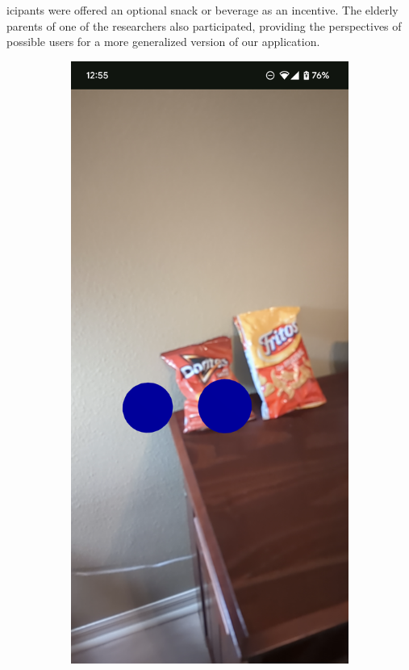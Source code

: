 \documentclass[thesis]{fputhesis}
\begin{document}
\begin{body}
icipants were offered an optional snack or beverage as an incentive. The elderly parents of one of the researchers also participated, providing the perspectives of possible users for a more generalized version of our application.
\begin{figure}[h]
    \centering
    \begin{subfigure}[]{0.3\textwidth}
        \centering
        \includegraphics[width=\linewidth]{Images/markeralignment.png}

\end{subfigure}
\end{figure}
\end{body}
\end{document}
